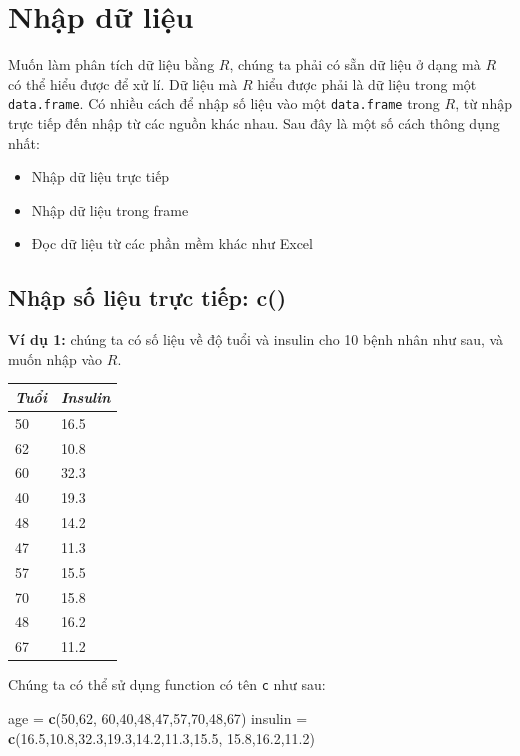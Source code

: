 \documentclass[
]{book}
\newenvironment{Shaded}{\begin{snugshade}}{\end{snugshade}}
\newcommand{\DecValTok}[1]{\textcolor[rgb]{0.00,0.00,0.81}{#1}}
\newcommand{\FloatTok}[1]{\textcolor[rgb]{0.00,0.00,0.81}{#1}}
\newcommand{\KeywordTok}[1]{\textcolor[rgb]{0.13,0.29,0.53}{\textbf{#1}}}
\newcommand{\NormalTok}[1]{#1}
\newcommand{\StringTok}[1]{\textcolor[rgb]{0.31,0.60,0.02}{#1}}
\providecommand{\tightlist}{%
  \setlength{\itemsep}{0pt}\setlength{\parskip}{0pt}}
\begin{document}
\hypertarget{Nhap-du-lieu}{%
\chapter{Nhập dữ liệu}\label{Nhap-du-lieu}}

Muốn làm phân tích dữ liệu bằng \(R\), chúng ta phải có sẵn dữ liệu ở dạng mà \(R\) có thể hiểu được để xử lí. Dữ liệu mà \(R\) hiểu được phải là dữ liệu trong một \texttt{data.frame}. Có nhiều cách để nhập số liệu vào một \texttt{data.frame} trong \(R\), từ nhập trực tiếp đến nhập từ các nguồn khác nhau. Sau đây là một số cách thông dụng nhất:

\begin{itemize}
\tightlist
\item
  Nhập dữ liệu trực tiếp
\item
  Nhập dữ liệu trong frame
\item
  Đọc dữ liệu từ các phần mềm khác như Excel
\end{itemize}

\hypertarget{nhux1eadp-sux1ed1-liux1ec7u-trux1ef1c-tiux1ebfp-c}{%
\section{Nhập số liệu trực tiếp: c()}\label{nhux1eadp-sux1ed1-liux1ec7u-trux1ef1c-tiux1ebfp-c}}

\textbf{Ví dụ 1:} chúng ta có số liệu về độ tuổi và insulin cho 10 bệnh nhân như sau, và muốn nhập vào \(R\).

\begin{longtable}[]{@{}ll@{}}
\toprule
\emph{Tuổi} & \emph{Insulin}\tabularnewline
\midrule
\endhead
50 & 16.5\tabularnewline
62 & 10.8\tabularnewline
60 & 32.3\tabularnewline
40 & 19.3\tabularnewline
48 & 14.2\tabularnewline
47 & 11.3\tabularnewline
57 & 15.5\tabularnewline
70 & 15.8\tabularnewline
48 & 16.2\tabularnewline
67 & 11.2\tabularnewline
\bottomrule
\end{longtable}

Chúng ta có thể sử dụng function có tên \texttt{c} như sau:

\begin{Shaded}
\begin{Highlighting}[]
\NormalTok{age =}\StringTok{ }\KeywordTok{c}\NormalTok{(}\DecValTok{50}\NormalTok{,}\DecValTok{62}\NormalTok{, }\DecValTok{60}\NormalTok{,}\DecValTok{40}\NormalTok{,}\DecValTok{48}\NormalTok{,}\DecValTok{47}\NormalTok{,}\DecValTok{57}\NormalTok{,}\DecValTok{70}\NormalTok{,}\DecValTok{48}\NormalTok{,}\DecValTok{67}\NormalTok{)}
\NormalTok{insulin =}\StringTok{ }\KeywordTok{c}\NormalTok{(}\FloatTok{16.5}\NormalTok{,}\FloatTok{10.8}\NormalTok{,}\FloatTok{32.3}\NormalTok{,}\FloatTok{19.3}\NormalTok{,}\FloatTok{14.2}\NormalTok{,}\FloatTok{11.3}\NormalTok{,}\FloatTok{15.5}\NormalTok{, }\FloatTok{15.8}\NormalTok{,}\FloatTok{16.2}\NormalTok{,}\FloatTok{11.2}\NormalTok{)}
\end{Highlighting}
\end{Shaded}
\end{document}
